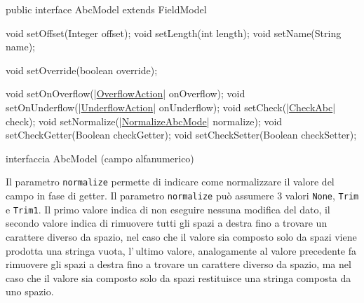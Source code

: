 \documentclass[a4paper,10pt]{report}
\newif\ifesource
\newenvironment{elisting}[1][H]
  {\captionsetup{aboveskip=0pt}\begin{listing}[#1]}
  {\end{listing}%
}
\begin{document}
\ifesource
\begin{figure*}[!htb]
\begin{lstlisting}[language=java, 
caption=interfaccia AbcModel (campo alfanumerico), 
label=lst:AbcModel]
public interface AbcModel extends FieldModel {
    void setOffset(Integer offset);
    void setLength(int length);
    void setName(String name);

    void setOverride(boolean override);

    void setOnOverflow((*\hyperref[lst:OverflowAction]{OverflowAction}*) onOverflow);
    void setOnUnderflow((*\hyperref[lst:UnderflowAction]{UnderflowAction}*) onUnderflow);
    void setCheck((*\hyperref[lst:CheckAbc]{CheckAbc}*) check);
    void setNormalize((*\hyperref[lst:NormalizeAbcMode]{NormalizeAbcMode}*) normalize);
    void setCheckGetter(Boolean checkGetter);
    void setCheckSetter(Boolean checkSetter);
}
\end{lstlisting}\index{AbcModel}
\end{figure*}
\else
\begin{elisting}[!htb]
\begin{javacode}
public interface AbcModel extends FieldModel {
    void setOffset(Integer offset);
    void setLength(int length);
    void setName(String name);

    void setOverride(boolean override);

    void setOnOverflow(|\hyperref[lst:OverflowAction]{OverflowAction}| onOverflow);
    void setOnUnderflow(|\hyperref[lst:UnderflowAction]{UnderflowAction}| onUnderflow);
    void setCheck(|\hyperref[lst:CheckAbc]{CheckAbc}| check);
    void setNormalize(|\hyperref[lst:NormalizeAbcMode]{NormalizeAbcMode}| normalize);
    void setCheckGetter(Boolean checkGetter);
    void setCheckSetter(Boolean checkSetter);
}
\end{javacode}
\caption{interfaccia AbcModel (campo alfanumerico)}
\label{lst:AbcModel}
\end{elisting}
\fi

Il parametro \hypertarget{abc:nrm}{\texttt{normalize}} permette di indicare come 
normalizzare il valore del campo in fase di getter.
Il parametro \verb!normalize! può assumere 3 valori \verb!None!, \verb!Trim! e
\verb!Trim1!. Il primo valore indica di non eseguire nessuna modifica del dato,
il secondo valore indica di rimuovere tutti gli spazi a destra fino a trovare
un carattere diverso da spazio, nel caso che il valore sia composto solo da
spazi viene prodotta una stringa vuota, l'\,ultimo valore, analogamente al 
valore precedente fa rimuovere gli spazi a destra fino a trovare un carattere
diverso da spazio, ma nel caso che il valore sia composto solo da spazi 
restituisce una stringa composta da uno spazio.
\end{document}
